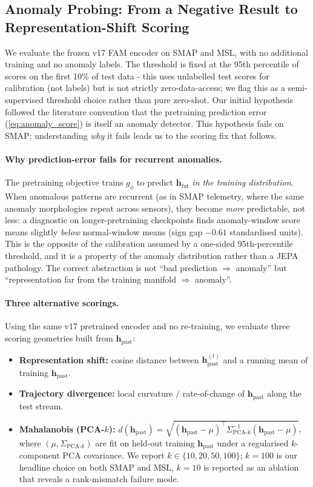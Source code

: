 \documentclass{article}
\newcommand{\h}{\mathbf{h}}
\newcommand{\predictor}{g_\phi}
\begin{document}
\subsection{Anomaly Probing: From a Negative Result to Representation-Shift Scoring}
\label{sec:anomaly_results}

We evaluate the frozen v17 FAM encoder on SMAP and MSL, with no additional training and no anomaly labels. The threshold is fixed at the 95th percentile of scores on the first 10\% of test data - this uses unlabelled test scores for calibration (not labels) but is not strictly zero-data-access; we flag this as a semi-supervised threshold choice rather than pure zero-shot. Our initial hypothesis followed the literature convention that the pretraining prediction error (\cref{eq:anomaly_score}) is itself an anomaly detector. This hypothesis fails on SMAP; understanding \emph{why} it fails leads us to the scoring fix that follows.

\paragraph{Why prediction-error fails for recurrent anomalies.} The pretraining objective trains $\predictor$ to predict $\h_\text{fut}$ \emph{in the training distribution}. When anomalous patterns are recurrent (as in SMAP telemetry, where the same anomaly morphologies repeat across sensors), they become \emph{more} predictable, not less: a diagnostic on longer-pretraining checkpoints finds anomaly-window score means slightly \emph{below} normal-window means (sign gap $-0.61$ standardised units). This is the opposite of the calibration assumed by a one-sided 95th-percentile threshold, and it is a property of the anomaly distribution rather than a JEPA pathology. The correct abstraction is not ``bad prediction $\Rightarrow$ anomaly'' but ``representation far from the training manifold $\Rightarrow$ anomaly''.

\paragraph{Three alternative scorings.} Using the same v17 pretrained encoder and no re-training, we evaluate three scoring geometries built from $\h_\text{past}$:
\begin{itemize}[nosep]
  \item \textbf{Representation shift:} cosine distance between $\h_\text{past}^{(t)}$ and a running mean of training $\h_\text{past}$.
  \item \textbf{Trajectory divergence:} local curvature / rate-of-change of $\h_\text{past}$ along the test stream.
  \item \textbf{Mahalanobis (PCA-$k$):} $d(\h_\text{past}) = \sqrt{(\h_\text{past} - \mu)^\top \Sigma_{\text{PCA-}k}^{-1} (\h_\text{past} - \mu)}$, where $(\mu, \Sigma_{\text{PCA-}k})$ are fit on held-out training $\h_\text{past}$ under a regularised $k$-component PCA covariance. We report $k \in \{10, 20, 50, 100\}$; $k=100$ is our headline choice on both SMAP and MSL, $k=10$ is reported as an ablation that reveals a rank-mismatch failure mode.
\end{itemize}
\end{document}
